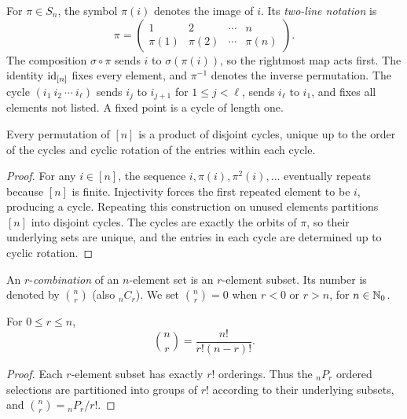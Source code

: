 \documentclass[11pt, oneside]{article}
\begin{document}
\begin{notation}
For $\pi\in S_n$, the symbol $\pi(i)$ denotes the image of $i$. Its \emph{two-line notation} is
\[
\pi=\begin{pmatrix}1&2&\cdots&n\\\pi(1)&\pi(2)&\cdots&\pi(n)\end{pmatrix}.
\]
The composition $\sigma\circ\pi$ sends $i$ to $\sigma(\pi(i))$, so the rightmost map acts first. The identity $\operatorname{id}_{[n]}$ fixes every element, and $\pi^{-1}$ denotes the inverse permutation. The cycle $(i_1\ i_2\ \cdots\ i_\ell)$ sends $i_j$ to $i_{j+1}$ for $1\le j<\ell$, sends $i_\ell$ to $i_1$, and fixes all elements not listed. A fixed point is a cycle of length one.
\end{notation}
\begin{proposition}
Every permutation of $[n]$ is a product of disjoint cycles, unique up to the order of the cycles and cyclic rotation of the entries within each cycle.
\end{proposition}
\begin{proof}
For any $i\in[n]$, the sequence $i, \pi(i), \pi^2(i), \ldots$ eventually repeats because $[n]$ is finite. Injectivity forces the first repeated element to be $i$, producing a cycle. Repeating this construction on unused elements partitions $[n]$ into disjoint cycles. The cycles are exactly the orbits of $\pi$, so their underlying sets are unique, and the entries in each cycle are determined up to cyclic rotation.
\end{proof}

\begin{definition}[Combinations]
An $r$-\emph{combination} of an $n$-element set is an $r$-element subset. Its number is denoted by $\binom nr$ (also ${}_nC_r$). We set $\binom nr=0$ when $r<0$ or $r>n$, for $n\in\mathbb{N}_0$.
\end{definition}
\begin{proposition}
For $0\le r\le n$,
\[
\binom nr=\frac{n!}{r!(n-r)!}.
\]
\end{proposition}
\begin{proof}
Each $r$-element subset has exactly $r!$ orderings. Thus the ${}_nP_r$ ordered selections are partitioned into groups of $r!$ according to their underlying subsets, and $\binom nr={}_nP_r/r!$.
\end{proof}
\end{document}
